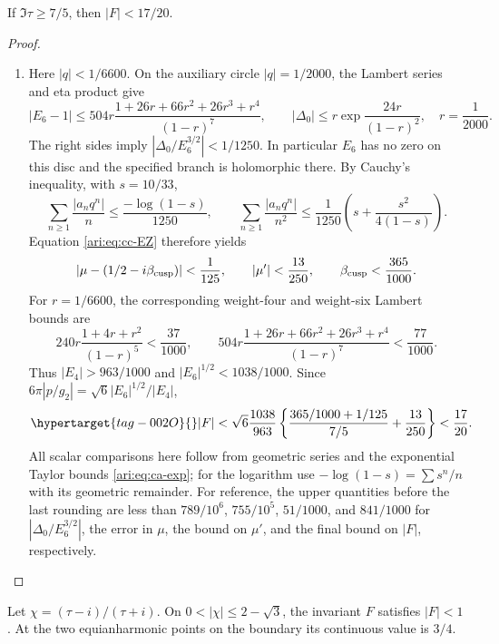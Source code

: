 \begin{proposition}\hypertarget{tag-001N}{}\label{ari:C.8.13}

If $\Im\tau\ge7/5$, then $|F|<17/20$.
\end{proposition}


\begin{proof}
\begin{enumerate}[label=\arabic*.,leftmargin=*]
\item Here $|q|<1/6600$. On the auxiliary circle $|q|=1/2000$,
the Lambert series and eta product give
\[
 |E_6-1|\le
 504r\frac{1+26r+66r^2+26r^3+r^4}{(1-r)^7},\qquad
 |\Delta_0|\le r\exp\!\frac{24r}{(1-r)^2},
 \quad r=\frac1{2000}.
\]
The right sides imply $|\Delta_0/E_6^{3/2}|<1/1250$.
In particular $E_6$ has no zero on this disc and the specified
branch is holomorphic there. By Cauchy's inequality, with
$s=10/33$,
\[
 \sum_{n\ge1}\frac{|a_nq^n|}{n}
 \le\frac{-\log(1-s)}{1250},\qquad
 \sum_{n\ge1}\frac{|a_nq^n|}{n^2}
 \le\frac1{1250}\left(s+\frac{s^2}{4(1-s)}\right).
\]
Equation \eqref{ari:eq:cc-EZ} therefore yields
\[
 |\mu-(1/2-i\beta_{\rm cusp})|<\frac1{125},\qquad
 |\mu'|<\frac{13}{250},\qquad \beta_{\rm cusp}<\frac{365}{1000}.
\]
For $r=1/6600$, the corresponding weight-four and weight-six
Lambert bounds are
\[
 240r\frac{1+4r+r^2}{(1-r)^5}<\frac{37}{1000},\qquad
 504r\frac{1+26r+66r^2+26r^3+r^4}{(1-r)^7}
       <\frac{77}{1000}.
\]
Thus $|E_4|>963/1000$ and $|E_6|^{1/2}<1038/1000$.
Since $6\pi|p/g_2|=\sqrt6|E_6|^{1/2}/|E_4|$,
\begin{equation}\hypertarget{tag-002O}{}\label{ari:eq:cc-cuspbound}
 |F|<\sqrt6\frac{1038}{963}
 \left\{\frac{365/1000+1/125}{7/5}+\frac{13}{250}\right\}
 <\frac{17}{20}.
\end{equation}
All scalar comparisons here follow from geometric series and
the exponential Taylor bounds \eqref{ari:eq:ca-exp}; for the logarithm
use $-\log(1-s)=\sum s^n/n$ with its geometric remainder.
For reference, the upper quantities before the last rounding are
less than $789/10^6$, $755/10^5$, $51/1000$, and $841/1000$
for $|\Delta_0/E_6^{3/2}|$, the error in $\mu$, the bound on
$\mu'$, and the final bound on $|F|$, respectively.
\end{enumerate}
\end{proof}

\begin{proposition}\hypertarget{tag-001O}{}\label{ari:C.8.14}

Let $\chi=(\tau-i)/(\tau+i)$. On
$0<|\chi|\le2-\sqrt3$, the invariant $F$ satisfies $|F|<1$.
At the two equianharmonic points on the boundary its continuous
value is $3/4$.
\end{proposition}



